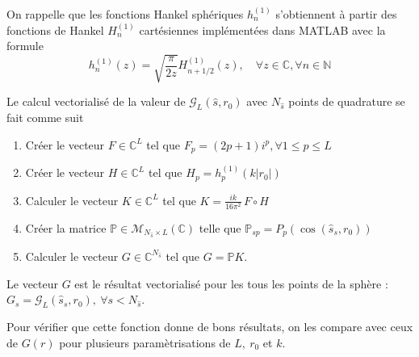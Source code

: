 \documentclass[11pt]{article}
\newcommand{\C}{\mathbb{C}}
\newcommand{\N}{\mathbb{N}}
\newcommand{\hs}{\hat{s}}
\newcommand{\lG}{\mathcal{G}}
\begin{document}
On rappelle que les fonctions Hankel sphériques $h^{(1)}_n$ s'obtiennent à partir des fonctions de Hankel $H^{(1)}_n$ cartésiennes
implémentées dans MATLAB avec la formule
\[
  h^{(1)}_n(z) = \sqrt{\frac{\pi}{2z}}H^{(1)}_{n+1/2}(z), \quad \forall z \in \C, \forall n \in \N
\]

Le calcul vectorialisé de la valeur de $\lG_L(\hs, r_0)$ avec $N_{\hs}$ points de quadrature se fait comme suit
\begin{enumerate}
\item Créer le vecteur $F\in\C^L$ tel que $F_p = (2p+1) i^p, \forall 1\leq p \leq L $ 
\item Créer le vecteur $H\in\C^L$ tel que $H_p = h^{(1)}_p(k|r_0|)$
\item Calculer le vecteur $K\in\C^L$ tel que $K = \frac{i k}{16 \pi^2}\,F \circ H$
\item Créer la matrice $\mathbb{P}\in\mathcal{M}_{N_{\hs}\times L}(\C)$ telle que $\mathbb{P}_{sp} = P_p(\cos(\hs_s, r_0))$
\item Calculer le vecteur $G\in\C^{N_{\hs}}$ tel que $G = \mathbb{P}K$.
\end{enumerate}
Le vecteur $G$ est le résultat vectorialisé pour les tous les points de la sphère : $G_s = \lG_L(\hs_s, r_0), ~ \forall s<N_{\hs}$.


Pour vérifier que cette fonction donne de bons résultats, on les compare avec ceux de $G(r)$ pour plusieurs paramètrisations de $L,~ r_0$
et $k$.
\end{document}
